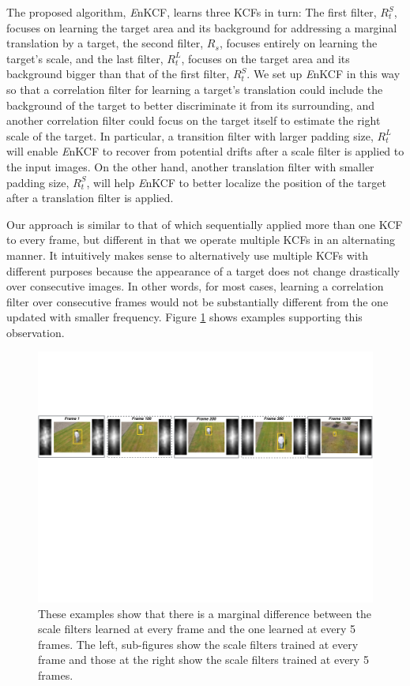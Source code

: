 \documentclass[10pt,twocolumn,letterpaper]{article}
\begin{document}
The proposed algorithm, {\it E}nKCF, learns three KCFs in turn: The
first filter, $R_{t}^{S}$, focuses on learning the target area and its
background for addressing a marginal translation by a target, the
second filter, $R_{s}$, focuses entirely on learning the target's
scale, and the last filter, $R_{t}^{L}$, focuses on the target area
and its background bigger than that of the first filter,
$R_{t}^{S}$. We set up {\it E}nKCF in this way so that a correlation
filter for learning a target's translation could include the
background of the target to better discriminate it from its
surrounding, and another correlation filter could focus on the target
itself to estimate the right scale of the target. In particular, a
transition filter with larger padding size, $R_{t}^{L}$ will enable
{\it E}nKCF to recover from potential drifts after a scale filter is
applied to the input images. On the other hand, another translation
filter with smaller padding size, $R_{t}^{S}$, will help {\it E}nKCF
to better localize the position of the target after a translation
filter is applied.

Our approach is similar to that of \cite{ma2015long} which
sequentially applied more than one KCF to every frame, but different
in that we operate multiple KCFs in an alternating manner. It
intuitively makes sense to alternatively use multiple KCFs with
different purposes because the appearance of a target does not change
drastically over consecutive images. In other words, for most cases,
learning a correlation filter over consecutive frames would not be
substantially different from the one updated with smaller
frequency. Figure \ref{fig:Filters_Comparison} shows examples
supporting this observation.

\begin{figure}[!h]
\centering
\includegraphics[width=1\textwidth]{./figures/LearnedFiltersComparison2.pdf}
\caption{These examples show that there is a marginal difference
  between the scale filters learned at every frame and the one learned
  at every 5 frames. The left, sub-figures show the scale filters
  trained at every frame and those at the right show the scale filters
  trained at every 5 frames.}
\label{fig:Filters_Comparison}
\end{figure}
\end{document}
